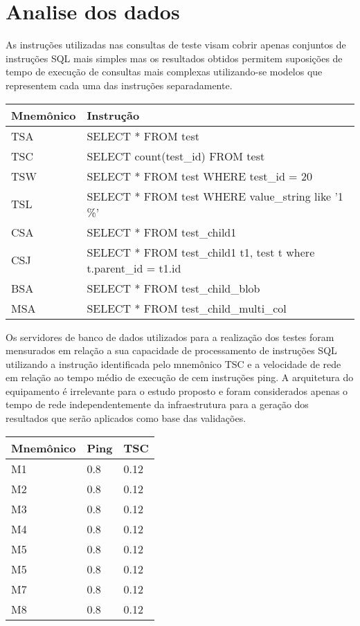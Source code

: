 \documentclass[12pt, a4paper]{article}
\begin{document}
\section{Analise dos dados}

As instruções utilizadas nas consultas de teste visam cobrir apenas conjuntos de instruções SQL mais simples
mas os resultados obtidos permitem suposições de tempo de execução de consultas mais complexas utilizando-se
modelos que representem cada uma das instruções separadamente.

\begin{tabular}{l l}
\hline
Mnemônico & Instrução \\
\hline
TSA & SELECT * FROM test \\
TSC & SELECT count(test\_id) FROM test \\
TSW & SELECT * FROM test WHERE test\_id = 20\\
TSL & SELECT * FROM test WHERE value\_string like '1 \%'\\
CSA & SELECT * FROM test\_child1\\
CSJ & SELECT * FROM test\_child1 t1, test t where t.parent\_id = t1.id\\
BSA & SELECT * FROM test\_child\_blob\\
MSA & SELECT * FROM test\_child\_multi\_col\\
\hline
\end{tabular}

Os servidores de banco de dados utilizados para a realização dos testes foram mensurados em relação a
sua capacidade de processamento de instruções SQL utilizando a instrução identificada pelo mnemônico
TSC e a velocidade de rede em relação ao tempo médio de execução de cem instruções ping. A arquitetura
do equipamento é irrelevante para o estudo proposto e foram considerados apenas o tempo de rede independentemente
da infraestrutura para a geração dos resultados que serão aplicados como base das validações.

\begin{tabular}{l l l}
\hline
Mnemônico & Ping & TSC \\
\hline
M1 & 0.8 & 0.12 \\
M2 & 0.8 & 0.12 \\
M3 & 0.8 & 0.12 \\
M4 & 0.8 & 0.12 \\
M5 & 0.8 & 0.12 \\
M5 & 0.8 & 0.12 \\
M7 & 0.8 & 0.12 \\
M8 & 0.8 & 0.12 \\
\hline
\end{tabular}
\end{document}
